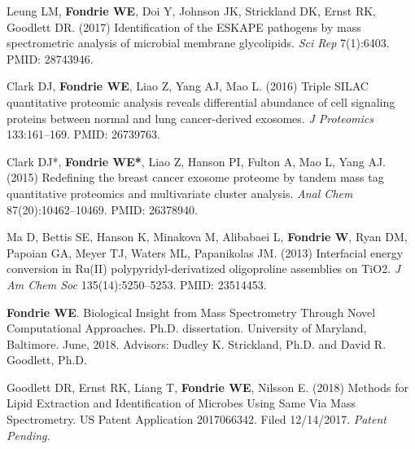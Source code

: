 \documentclass{article}
\newcommand{\mysection}[1]{\vspace{1ex {\bf \large \textrm{#1}} \quad
    \hrulefill}}
\begin{document}
\begin{etaremune}
  \item Leung LM, {\bf Fondrie WE}, Doi Y, Johnson JK, Strickland DK, Ernst RK,
    Goodlett DR. (2017) Identification of the ESKAPE pathogens by mass
    spectrometric analysis of microbial membrane glycolipids. {\it Sci Rep}
    7(1):6403. PMID: 28743946. 

  \item Clark DJ, {\bf Fondrie WE}, Liao Z, Yang AJ, Mao L. (2016) Triple SILAC
    quantitative proteomic analysis reveals differential abundance of cell
    signaling proteins between normal and lung cancer-derived exosomes. {\it J
      Proteomics} 133:161--169. PMID: 26739763.

  \item Clark DJ*, {\bf Fondrie WE*}, Liao Z, Hanson PI, Fulton A, Mao L, Yang
    AJ. (2015) Redefining the breast cancer exosome proteome by tandem mass tag
    quantitative proteomics and multivariate cluster analysis. \textit{Anal
      Chem} 87(20):10462--10469. PMID: 26378940. 
    
  \item Ma D, Bettis SE, Hanson K, Minakova M, Alibabaei L, {\bf Fondrie W},
    Ryan DM, Papoian GA, Meyer TJ, Waters ML, Papanikolas JM. (2013) Interfacial
    energy conversion in Ru(II) polypyridyl-derivatized oligoproline assemblies
    on TiO2. \textit{J Am Chem Soc} 135(14):5250--5253. PMID: 23514453. 
\end{etaremune}

\mysection{Additional Publications}
\begin{etaremune}
  \item {\bf Fondrie WE}. Biological Insight from Mass Spectrometry Through
    Novel Computational Approaches. Ph.D. dissertation. University of Maryland,
    Baltimore. June, 2018. Advisors: Dudley K. Strickland, Ph.D. and David R.
    Goodlett, Ph.D.
\end{etaremune}

\mysection{Patents}
\begin{etaremune}
  \item Goodlett DR, Ernst RK, Liang T, {\bf Fondrie WE}, Nilsson E. (2018)
    Methods for Lipid Extraction and Identification of Microbes Using Same Via
    Mass Spectrometry. US Patent Application 2017066342. Filed 12/14/2017. {\it
      Patent Pending.}
\end{etaremune}
\end{document}
